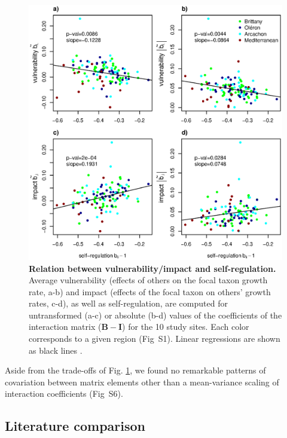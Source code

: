 \documentclass[10pt]{article}
\begin{document}
\begin{figure}[!h]
\centering \includegraphics[width=1\textwidth]{pencen_generality_vs_vulnerability_MainFig}
\caption{\textbf{Relation between vulnerability/impact and self-regulation.}
Average vulnerability (effects of others on the focal taxon growth
rate, a-b) and impact (effects of the focal taxon on others' growth
rates, c-d), as well as self-regulation, are computed for untransformed
(a-c) or absolute (b-d) values of the coefficients of the interaction
matrix ($\mathbf{B}-\mathbf{I}$) for the 10 study sites. Each color
corresponds to a given region (Fig~S1). Linear regressions are shown
as black lines .}
\label{fig:Vulnerability_impact}
\end{figure}

Aside from the trade-offs of Fig. \ref{fig:Vulnerability_impact},
we found no remarkable patterns of covariation between matrix elements
other than a mean-variance scaling of interaction coefficients (Fig~S6).

\subsection*{Literature comparison}
\end{document}
